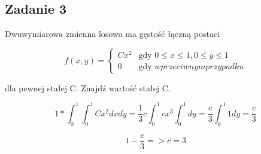 \subsection{Zadanie 3}

Dwuwymiarowa zmienna losowa ma gęstość łączną postaci

$$
f(x,y)
 = \left\{ \begin{array}{ll}
Cx^2& \text{gdy }0 \leq x \leq 1, 0 \leq y \leq 1\\
0 & \text{gdy }w przeciwnym przypadku
\end{array} \right.
$$

dla pewnej stałej C. Znajdź wartość stałej C.


$$
1 * \int_{0}^{1}\int_{0}^{1} Cx^2 dxdy = \frac{1}{3}c\int_{0}^{1}cx^3\int_{0}^{1}dy = \frac{c}{3}\int_{0}^{1}1dy = \frac{c}{3}
$$

$$
1-\frac{c}{3} => c = 3
$$
